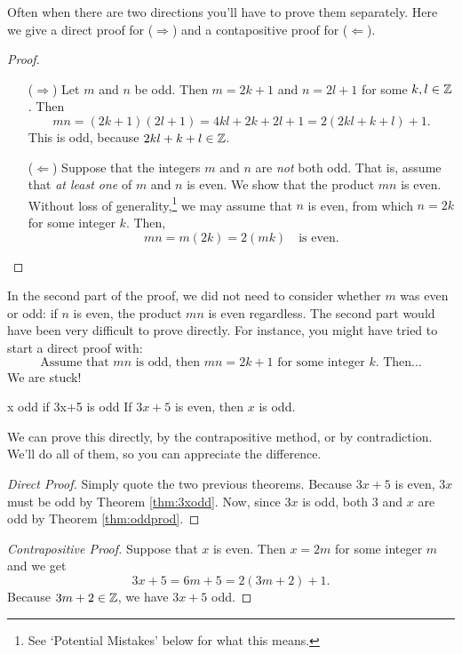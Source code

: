  Often when there are two directions you'll have to prove them separately. Here we give a direct proof for ($\Rightarrow$) and a contapositive proof for ($\Leftarrow$).

\begin{proof}
\begin{enumerate}
  \item[($\Rightarrow$)] Let $m$ and $n$ be odd. Then $m=2k+1$ and $n=2l+1$ for some $k,l\in\mathbb{Z}$. Then
  \[mn=(2k+1)(2l+1)=4kl+2k+2l+1=2(2kl+k+l)+1.\]
  This is odd, because $2kl+k+l\in\mathbb{Z}$.
  \item[($\Leftarrow$)] Suppose that the integers $m$ and $n$ are \emph{not} both odd. That is, assume that \emph{at least one} of $m$ and $n$ is even. We show that the product $mn$ is even. Without loss of generality,\footnote{See `Potential Mistakes' below for what this means.} we may assume that $n$ is even, from which $n=2k$ for some integer $k$. Then,
  \[mn=m(2k)=2(mk)\quad\text{is even}.\tag*{\qedhere}\]
\end{enumerate}
\end{proof}

 In the second part of the proof, we did not need to consider whether $m$ was even or odd: if $n$ is even, the product $mn$ is even regardless. The second part would have been very difficult to prove directly. For instance, you might have tried to start a direct proof with:
\[\text{Assume that $mn$ is odd, then $mn=2k+1$ for some integer $k$. Then\ldots}\]
We are stuck!

\begin{thm}{}{x odd if 3x+5 is odd}
If $3x+5$ is even, then $x$ is odd.
\end{thm}

We can prove this directly, by the contrapositive method, or by contradiction. We'll do all of them, so you can appreciate the difference. 

\begin{proof}[Direct Proof] Simply quote the two previous theorems. Because $3x+5$ is even, $3x$ must be odd by Theorem \ref{thm:3xodd}. Now, since   $3x$ is odd,  both $3$ and $x$ are odd by Theorem \ref{thm:oddprod}.
\end{proof}
 
\begin{proof}[Contrapositive Proof] Suppose that $x$ is even. Then $x=2m$ for some integer $m$ and we get
  \[3x+5=6m+5=2(3m+2)+1.\]
Because $3m+2\in\mathbb{Z}$, we have $3x+5$ odd. 
\end{proof}


